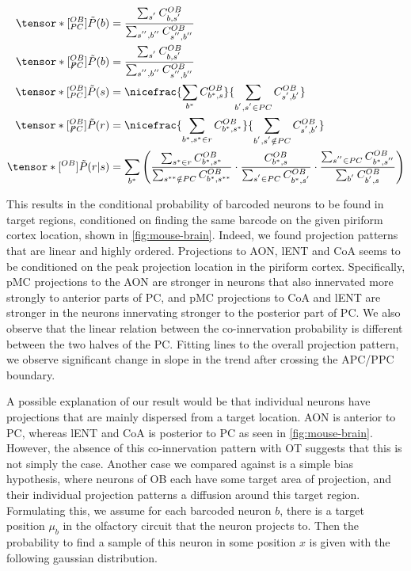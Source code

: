\documentclass[../dissertation.tex]{subfiles}
\begin{document}
\begin{align}
    \label{eqn:probB_alt}
    \tensor*[^{OB}_{PC}]{\tilde{P}}{}      (b) & = \frac{     \sum_{s^{'}} C^{OB}_{b,s^{'}}                   }{ \sum_{s^{''},b^{''}} C^{OB}_{s^{''},b^{''}}         } \\
    \tensor*[^{OB}_{\not PC}]{\tilde{P}}{} (b) & = \frac{     \sum_{s^{'}} C^{OB}_{b,s^{'}}                   }{ \sum_{s^{''},b^{''}} C^{OB}_{s^{''},b^{''}}         } \\
    \tensor*[^{OB}_{PC}]{\tilde{P}}{}      (s) & = \nicefrac{ \sum_{b^{*}}              C^{OB}_{b^{*}, s    } }{ \sum_{b^{'}, s^{'} \in    PC} C^{OB}_{s^{'}, b^{'}} } \\
    \tensor*[^{OB}_{\not PC}]{\tilde{P}}{} (r) & = \nicefrac{ \sum_{b^{*}, s^{*} \in r} C^{OB}_{b^{*}, s^{*}} }{ \sum_{b^{'}, s^{'} \notin PC} C^{OB}_{s^{'}, b^{'}} } \\
    \tensor*[^{OB}]{\tilde{P}}{} (r | s)       & = \sum_{ b^{*} } \left(
        \frac{ \sum_{ s^{*}  \in r  } C^{OB}_{ b^{*} , s^{*}  } }{ \sum_{ s^{**} \notin PC} C^{OB}_{ b^{*} , s^{**} } } \cdot
        \frac{                        C^{OB}_{ b^{*} , s      } }{ \sum_{ s^{ '} \in    PC} C^{OB}_{ b^{*} , s^{'}  } } \cdot
        \frac{ \sum_{ s^{''} \in PC } C^{OB}_{ b^{*} , s^{''} } }{ \sum_{ b^{'}           } C^{OB}_{ b^{'} , s      } }
    \right)
\end{align}

This results in the conditional probability of barcoded neurons to be found in target regions, conditioned on finding the same barcode on the given piriform cortex location, shown in \cref{fig:mouse-brain}.
Indeed, we found projection patterns that are linear and highly ordered.
Projections to AON, lENT and CoA seems to be conditioned on the peak projection location in the piriform cortex.
Specifically, pMC projections to the AON are stronger in neurons that also innervated more strongly to anterior parts of PC, and pMC projections to CoA and lENT are stronger in the neurons innervating stronger to the posterior part of PC.
We also observe that the linear relation between the co-innervation probability is different between the two halves of the PC.
Fitting lines to the overall projection pattern, we observe significant change in slope in the trend after crossing the APC/PPC boundary.

A possible explanation of our result would be that individual neurons have projections that are mainly dispersed from a target location.
AON is anterior to PC, whereas lENT and CoA is posterior to PC as seen in \cref{fig:mouse-brain}.
However, the absence of this co-innervation pattern with OT suggests that this is not simply the case.
Another case we compared against is a simple bias hypothesis, where neurons of OB each have some target area of projection, and their individual projection patterns a diffusion around this target region.
Formulating this, we assume for each barcoded neuron $b$, there is a target position $\mu_b$ in the olfactory circuit that the neuron projects to.
Then the probability to find a sample of this neuron in some position $x$ is given with the following gaussian distribution.
\end{document}
